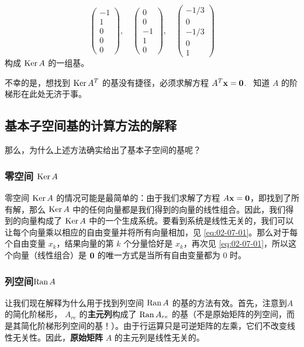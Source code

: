$$
\begin{pmatrix} -1 \\ 1 \\ 0 \\ 0 \\ 0 \end{pmatrix}, \quad \begin{pmatrix} 0 \\ 0 \\ -1 \\ 1 \\ 0 \end{pmatrix}, \quad \begin{pmatrix} -1/3 \\ 0 \\ -1/3 \\ 0 \\ 1 \end{pmatrix}
$$
构成 $\operatorname{Ker} A$ 的一组基。

不幸的是，想找到 $\operatorname{Ker} A^T$ 的基没有捷径，必须求解方程 $A^T \mathbf{x} = \mathbf{0}$. ~知道 $A$ 的阶梯形在此处无济于事。

\subsection{基本子空间基的计算方法的解释}\label{sec:02-07-02}

那么，为什么上述方法确实给出了基本子空间的基呢？

\subsubsection{\texorpdfstring{零空间 $\operatorname{Ker} A$}{零空间 Ker A}}\label{sec:02-07-02-01}

零空间 $\operatorname{Ker} A$ 的情况可能是最简单的：由于我们求解了方程 $A \mathbf{x} = \mathbf{0}$，即找到了所有解，那么 $\operatorname{Ker} A$ 中的任何向量都是我们得到的向量的线性组合。因此，我们得到的向量构成了 $\operatorname{Ker} A$ 中的一个生成系统。要看到系统是线性无关的，我们可以让每个向量乘以相应的自由变量并将所有向量相加，见 \eqref{eq:02-07-01}。那么对于每个自由变量 $x_k$，结果向量的第 $k$ 个分量恰好是 $x_k$，再次见 \eqref{eq:02-07-01}，所以这个向量（线性组合）是 $\mathbf{0}$ 的唯一方式是当所有自由变量都为 0 时。

\subsubsection{\texorpdfstring{列空间$\operatorname{Ran} A$}{列空间 Ran A}}\label{sec:02-07-02-02}

让我们现在解释为什么用于找到列空间 $\operatorname{Ran} A$ 的基的方法有效。首先，注意到$A$ 的简化阶梯形， $A_{re}$ 的\textbf{主元列}构成了 $\operatorname{Ran} A_{re}$ 的基（不是原始矩阵的列空间，而是其简化阶梯形列空间的基！）。由于行运算只是可逆矩阵的左乘，它们不改变线性无关性。因此，\textbf{原始矩阵} $A$ 的主元列是线性无关的。

